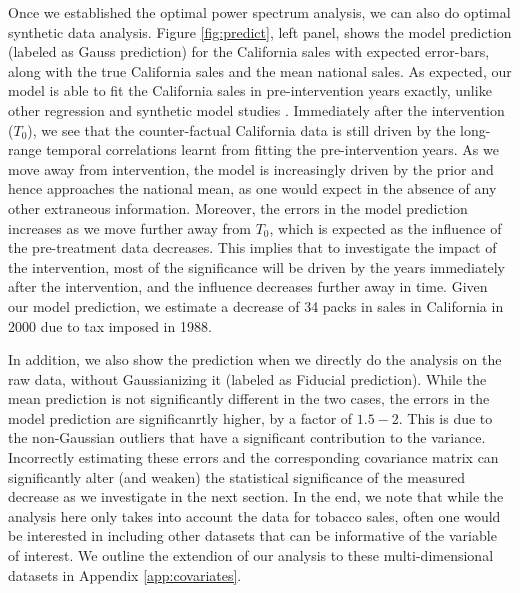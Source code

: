 \documentclass{article}
\begin{document}
Once we established the optimal power spectrum analysis, we can also do optimal synthetic data analysis. 
Figure \ref{fig:predict}, left panel, shows the model prediction (labeled as Gauss prediction) for the California sales with expected error-bars, along with the true California sales and the mean national sales. As expected, our model is able to fit the California sales in pre-intervention years exactly, unlike other regression and synthetic model studies \cite{Ben-Michael18}. Immediately after the intervention ($T_0$), we see that the counter-factual California data is still driven by the long-range temporal correlations learnt from fitting the pre-intervention years. As we move away from intervention, the model is increasingly driven by the prior and hence approaches the national mean, as one would expect in the absence of any other extraneous information. Moreover, the errors in the model prediction increases as we move further away from $T_0$, which is expected as the influence of the pre-treatment data decreases. This implies that to investigate the impact of the intervention, most of the significance will be driven by the years immediately after the intervention, and the influence decreases further away in time. Given our model prediction, we estimate a decrease of 34 packs in sales in California in 2000 due to tax imposed in 1988. 

In addition, we also show the prediction when we directly do the analysis on the raw data, without Gaussianizing it (labeled as Fiducial prediction). While the mean prediction is not significantly different in the two cases, the errors in the model prediction are significanrtly higher, by a factor of $1.5-2$. This is due to the non-Gaussian outliers that have a significant contribution to the variance. 
Incorrectly estimating these errors and the corresponding covariance matrix can significantly alter (and weaken) the statistical significance of the measured decrease as we investigate in the next section. In the end, we note that while the analysis here only takes into account the data for tobacco sales, often one would be interested in including other datasets that can be informative of the variable of interest. We outline the extendion of our analysis to these multi-dimensional datasets in Appendix \ref{app:covariates}.

\end{document}
